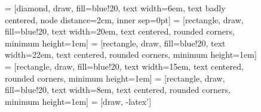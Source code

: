 \documentclass[5p,times]{elsarticle}
\begin{document}
\begin{figure}[!h]
\centering
{} = [diamond, draw, fill=blue!20, text width=6em, text badly centered, node distance=2cm, inner sep=0pt]
 = [rectangle, draw, fill=blue!20, text width=20em, text centered, rounded corners, minimum height=1em]
 = [rectangle, draw, fill=blue!20, text width=22em, text centered, rounded corners, minimum height=1em]
 = [rectangle, draw, fill=blue!20, text width=15em, text centered, rounded corners, minimum height=1em]
 = [rectangle, draw, fill=blue!20, text width=8em, text centered, rounded corners, minimum height=1em]
 = [draw, -latex']

\end{figure}
\end{document}

